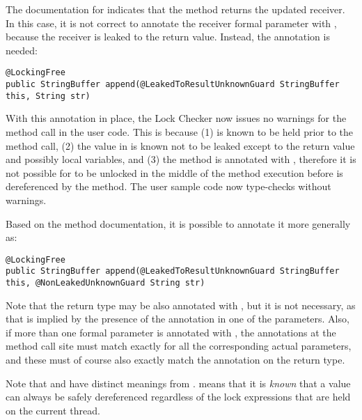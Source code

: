 The documentation for 
indicates that the method returns the updated receiver.  In this case,
it is not correct to annotate the receiver formal parameter with
, because the receiver is leaked to the
return value.  Instead, the  annotation is needed:

\begin{verbatim}
@LockingFree
public StringBuffer append(@LeakedToResultUnknownGuard StringBuffer this, String str)
\end{verbatim}

With this  annotation in place, the
Lock Checker now issues no warnings for the 
method call in the user code.  This is because (1) 
is known to be held prior to the method call, (2) the
value in  is known not to be leaked except to the return
value and possibly local variables, and (3) the method
is annotated with , therefore it is not possible
for  to be unlocked in the middle of the method execution
before  is dereferenced by the method.  The
user sample code now type-checks without warnings.

Based on the method documentation, it is possible to annotate it more generally as:

\begin{verbatim}
@LockingFree
public StringBuffer append(@LeakedToResultUnknownGuard StringBuffer this, @NonLeakedUnknownGuard String str)
\end{verbatim}

Note that the return type may be also annotated with ,
but it is not necessary, as that is implied by the presence of the 
annotation in one of the parameters.  Also, if more than one formal parameter
is annotated with , the 
annotations at the method call site must match exactly for all the corresponding
actual parameters, and these must of course also exactly match the 
annotation on the return type.

Note that  and 
have distinct meanings from .  
means that it is \emph{known} that a value can always be safely dereferenced
regardless of the lock expressions that are held on the current thread.

